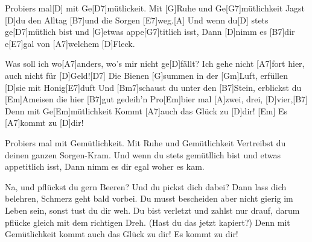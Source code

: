 
\begin{spacing}{0.95}


\begin{guitar}
	\begin{highlightbar}
		Probiers mal[D] mit Ge[D7]mütlickeit. Mit [G]Ruhe und Ge[G7]mütlichkeit
		Jagst [D]du den Alltag [B7]und die Sorgen [E7]weg.[A]{}
		Und wenn du[D] stets ge[D7]mütlich bist und [G]etwas appe[G7]titlich isst,
		Dann [D]nimm es [B7]dir e[E7]gal von [A7]welchem [D]Fleck.
	\end{highlightbar}
	
	\songsection{Strophe 1}
	Was soll ich wo[A7]anders, wo's mir nicht ge[D]fällt?
	Ich gehe nicht [A7]fort hier, auch nicht für [D]Geld![D7]{}
	Die Bienen [G]summen in der [Gm]Luft, erfüllen [D]sie mit Honig[E7]duft
	Und [Bm7]schaust du unter den [B7]Stein, erblickst du [Em]Ameisen die hier [B7]gut gedeih'n
	Pro[Em]bier mal [A]zwei, drei, [D]vier,[B7]{}
	Denn mit Ge[Em]mütlichkeit Kommt [A7]auch das Glück zu [D]dir!
	[Em] Es [A7]kommt zu [D]dir!
	
	\begin{highlightbar}
		\songsection{Refrain}
		Probiers mal mit Gemütlichkeit. Mit Ruhe und Gemütlichkeit
		Vertreibst du deinen ganzen Sorgen-Kram.
		Und wenn du stets gemütllich bist und etwas appetitlich isst,
		Dann nimm es dir egal woher es kam.
	\end{highlightbar}
	
	Na, und pflückst du gern Beeren? Und du pickst dich dabei?
	Dann lass dich belehren, Schmerz geht bald vorbei.
	Du musst bescheiden aber nicht gierig im Leben sein, sonst tust du dir weh.
	Du bist verletzt und zahlst nur drauf, darum pflücke gleich mit dem richtigen Dreh.\vspace{-0.5em}
	(Hast du das jetzt kapiert?)
	Denn mit Gemütlichkeit kommt auch das Glück zu dir!
	Es kommt zu dir!
\end{guitar}\end{spacing}